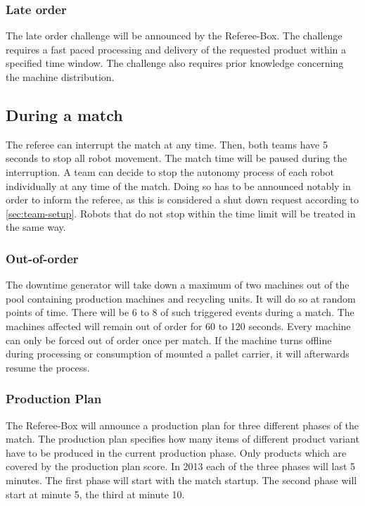 \documentclass[12pt,twoside]{article}
\newenvironment{rulechange}{}{}
\begin{document}
\subsubsection{Late order}

The late order challenge will be announced by the Referee-Box. The
challenge requires a fast paced processing and delivery of the
requested product within a specified time window. The challenge also
requires prior knowledge concerning the machine distribution.

\subsection{During a match}

The referee can interrupt the match at any time. Then, both teams have
5 seconds to stop all robot movement. The match time will be paused
during the interruption. A team can decide to stop the autonomy
process of each robot individually at any time of the match. Doing so
has to be announced notably in order to inform the referee, as this is
considered a shut down request according to
\ref{sec:team-setup}. Robots that do not stop within the time limit
will be treated in the same way.

\subsubsection{Out-of-order}

The downtime generator will take down a maximum of two machines out of
the pool containing production machines and recycling units. It will
do so at random points of time. There will be 6 to 8 of such triggered
events during a match. The machines affected will remain out of order
for 60 to 120 seconds. Every machine can only be forced out of order
once per match. If the machine turns offline during processing or
consumption of mounted a pallet carrier, it will afterwards resume the
process.

\subsubsection{Production Plan}

\begin{rulechange}
The Referee-Box will announce a production plan for three different phases of
the match. The production plan specifies how many items of different product
variant have to be produced in the current production phase. Only products which
are covered by the production plan score. In 2013 each of the three phases will
last 5 minutes. The first phase will start with the match startup.  The second
phase will start at minute 5, the third at minute 10.

\end{rulechange} 
\end{document}
